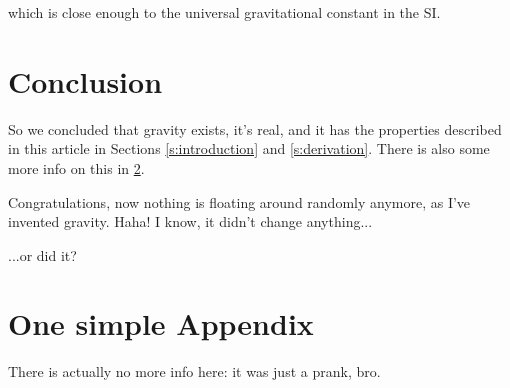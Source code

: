 \documentclass[preprint,12pt]{elsarticle}
\begin{document}
\noindent
which is close enough to the universal gravitational constant in the SI.

\section{Conclusion}

So we concluded that gravity exists, it's real, and it has the properties described in this article in Sections \ref{s:introduction} and \ref{s:derivation}. There is also some more info on this in \ref{s:appendix}.

Congratulations, now nothing is floating around randomly anymore, as I've invented gravity. Haha! I know, it didn't change anything...

\noindent
...or did it?



\newpage
\appendix
\section{One simple Appendix}\label{s:appendix}

There is actually no more info here: it was just a prank, bro.
\end{document}
